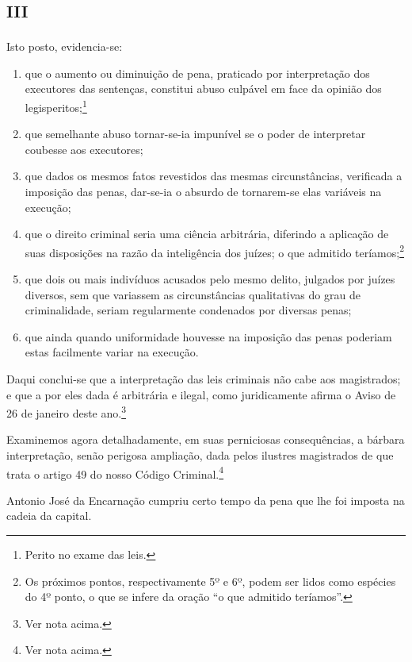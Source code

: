 \section{\textsc{iii}}

Isto posto, evidencia-se:

\begin{enumerate}[label=\arabic*º:]
\item que o aumento ou diminuição de pena, praticado por interpretação dos
executores das sentenças, constitui abuso culpável em face da opinião
dos legisperitos;\footnote{Perito no exame das leis.}

\item que semelhante abuso tornar-se-ia impunível se o poder de
interpretar coubesse aos executores;

\item que dados os mesmos fatos revestidos das mesmas circunstâncias,
verificada a imposição das penas, dar-se-ia o absurdo de tornarem-se
elas variáveis na execução;

\item que o direito criminal seria uma ciência arbitrária, diferindo a
aplicação de suas disposições na razão da inteligência dos juízes; o que
admitido teríamos;\footnote{Os próximos pontos, respectivamente 5º e
  6º, podem ser lidos como espécies do 4º ponto, o que se infere da
  oração ``o que admitido teríamos''.}

\item que dois ou mais indivíduos acusados pelo mesmo delito, julgados por
juízes diversos, sem que variassem as circunstâncias qualitativas do
grau de criminalidade, seriam regularmente condenados por diversas
penas;

\item que ainda quando uniformidade houvesse na imposição das penas
poderiam estas facilmente variar na execução.
\end{enumerate}

Daqui conclui-se que a interpretação das leis criminais não cabe aos
magistrados; e que a por eles dada é arbitrária e ilegal, como
juridicamente afirma o Aviso de 26 de janeiro deste ano.\footnote{Ver
  nota acima.} %

Examinemos agora detalhadamente, em suas perniciosas consequências, a
bárbara interpretação, senão perigosa ampliação, dada pelos ilustres
magistrados de que trata o artigo 49 do nosso Código
Criminal.\footnote{Ver nota acima.}

Antonio José da Encarnação cumpriu certo tempo da pena que lhe foi
imposta na cadeia da capital.

